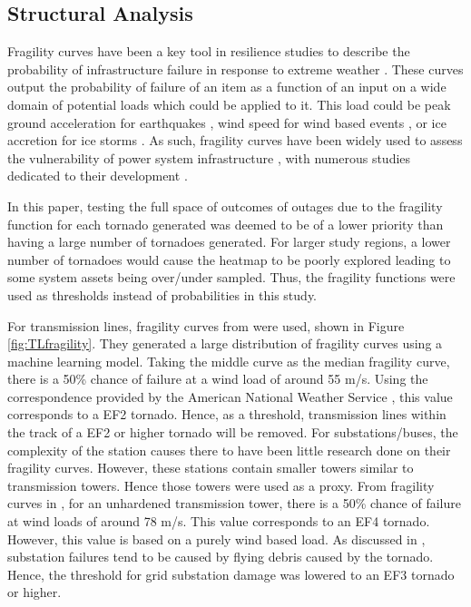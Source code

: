 \documentclass[12pt]{article}
\begin{document}
\subsection{Structural Analysis} \label{FragilityCurve}
Fragility curves have been a key tool in resilience studies to describe the probability of infrastructure failure in response to extreme weather \cite{serrano2023comprehensive}. These curves output the probability of failure of an item as a function of an input on a wide domain of potential loads which could be applied to it. This load could be peak ground acceleration for earthquakes \cite{zekavati2022regional}, wind speed for wind based events \cite{serrano2023comprehensive}, or ice accretion for ice storms \cite{Sheng2023}. As such, fragility curves have been widely used to assess the vulnerability of power system infrastructure \cite{panteli}, with numerous studies dedicated to their development \cite{serrano2023comprehensive}. \par
In this paper, testing the full space of outcomes of outages due to the fragility function for each tornado generated was deemed to be of a lower priority than having a large number of tornadoes generated. For larger study regions, a lower number of tornadoes would cause the heatmap to be poorly explored leading to some system assets being over/under sampled. Thus, the fragility functions were used as thresholds instead of probabilities in this study. \par
For transmission lines, fragility curves from \cite{Watson2024} were used, shown in Figure \ref{fig:TLfragility}. They generated a large distribution of fragility curves using a machine learning model. Taking the middle curve as the median fragility curve, there is a 50\% chance of failure at a wind load of around 55 m/s. Using the correspondence provided by the American National Weather Service \cite{NWS}, this value corresponds to a EF2 tornado. Hence, as a threshold, transmission lines within the track of a EF2 or higher tornado will be removed. For substations/buses, the complexity of the station causes there to have been little research done on their fragility curves. However, these stations contain smaller towers similar to transmission towers. Hence those towers were used as a proxy. From fragility curves in \cite{dosReis2022}, for an unhardened transmission tower, there is a 50\% chance of failure at wind loads of around 78 m/s. This value corresponds to an EF4 tornado. However, this value is based on a purely wind based load. As discussed in \cite{april}, substation failures tend to be caused by flying debris caused by the tornado. Hence, the threshold for grid substation damage was lowered to an EF3 tornado or higher. \par
\end{document}
